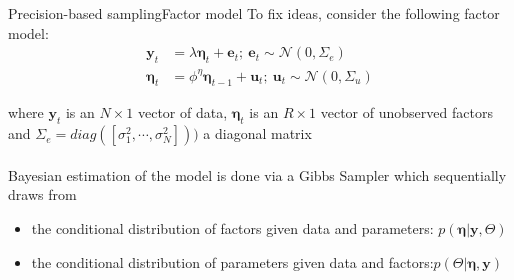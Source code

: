 \documentclass[xcolor=svgnames, 10pt, aspectratio=169]{beamer}
\begin{document}
\begin{frame}{Precision-based sampling}{Factor model}
    To fix ideas, consider the following factor model:
    \begin{align*}
        \mathbf{y}_t &= \lambda \boldsymbol{\eta}_t + \mathbf{e}_t ;\: \mathbf{e}_t \sim \mathcal{N}(0, \Sigma_e)\\
        \boldsymbol{\eta}_t &= \phi^{\eta} \boldsymbol{\eta}_{t-1} + \mathbf{u}_t;\: \mathbf{u}_t \sim \mathcal{N}(0, \Sigma_u)
    \end{align*}

    where $\mathbf{y}_t$ is an $N\times 1$ vector of data, $\boldsymbol{\eta}_t$ is an $R\times 1$ vector of unobserved factors and $\Sigma_e = diag([\sigma^2_1, \cdots, \sigma^2_N]))$ a diagonal matrix \\~\\

    Bayesian estimation of the model is done via a Gibbs Sampler which sequentially draws from \vspace{0.2cm}
    \begin{itemize}
        \item the conditional distribution of factors given data and parameters: $p(\boldsymbol{\eta} | \mathbf{y}, \Theta)$ 
        \item the conditional distribution of parameters given data and factors:$p(\Theta | \boldsymbol{\eta}, \mathbf{y})$
    \end{itemize}


\end{frame}
\end{document}
